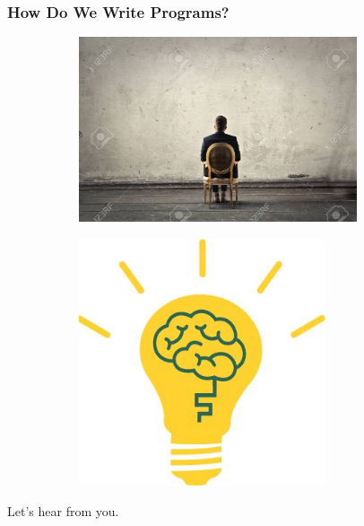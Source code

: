 \documentclass{beamer}
\begin{document}
\begin{frame}
  \frametitle{How Do We Write Programs?}
  \begin{figure}
    \begin{subfigure}[b]{0.4\textwidth}
      \includegraphics[width=0.9\textwidth]{images/staring-at-a-blank-wall.jpg}
    \end{subfigure}
    \pause
    \begin{subfigure}[b]{0.4\textwidth}
      \includegraphics[width=0.8\textwidth]{images/eureka.jpg}
    \end{subfigure}
  \end{figure}
\end{frame}

\begin{frame}
  \begin{center}
    \huge Let's hear from you.
  \end{center}
\end{frame}
\end{document}
